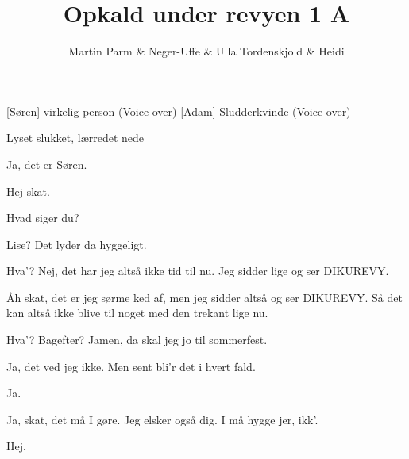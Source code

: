 \documentclass[a4paper]{article}
\title{Opkald under revyen 1 A}
\author{Martin Parm \& Neger-Uffe \& Ulla Tordenskjold \& Heidi}
\begin{document}
\maketitle

\begin{roles}
[Søren] virkelig person (Voice over)
[Adam] Sludderkvinde (Voice-over)
\end{roles}

\begin{sketch}
\scene Lyset slukket, lærredet nede


 Ja, det er Søren.


 Hej skat.


 Hvad siger du?


 Lise? Det lyder da hyggeligt.


 Hva'? Nej, det har jeg altså ikke tid til nu. Jeg sidder lige og ser
DIKUREVY.


 Åh skat, det er jeg sørme ked af, men jeg sidder altså og ser
DIKUREVY. Så det kan altså ikke blive til noget med den trekant lige nu.


 Hva'? Bagefter? Jamen, da skal jeg jo til sommerfest.


 Ja, det ved jeg ikke. Men sent bli'r det i hvert fald.


 Ja.


 Ja, skat, det må I gøre. Jeg elsker også dig. I må hygge jer,
ikk'.


 Hej.
\end{sketch}
\end{document}
